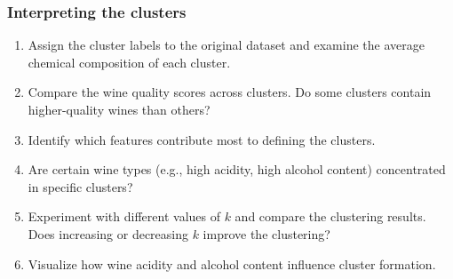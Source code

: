 \documentclass[
  11pt,
]{book}
\providecommand{\tightlist}{%
  \setlength{\itemsep}{0pt}\setlength{\parskip}{0pt}}
\theoremstyle{definition}
\theoremstyle{definition}
\theoremstyle{definition}
\theoremstyle{definition}
\theoremstyle{remark}
\begin{document}
\subsubsection*{Interpreting the clusters}\label{interpreting-the-clusters}


\begin{enumerate}
\def\labelenumi{\arabic{enumi}.}
\setcounter{enumi}{30}
\tightlist
\item
  Assign the cluster labels to the original dataset and examine the average chemical composition of each cluster.\\
\item
  Compare the wine quality scores across clusters. Do some clusters contain higher-quality wines than others?\\
\item
  Identify which features contribute most to defining the clusters.\\
\item
  Are certain wine types (e.g., high acidity, high alcohol content) concentrated in specific clusters?\\
\item
  Experiment with different values of \(k\) and compare the clustering results. Does increasing or decreasing \(k\) improve the clustering?\\
\item
  Visualize how wine acidity and alcohol content influence cluster formation.
\end{enumerate}

  
\end{document}
